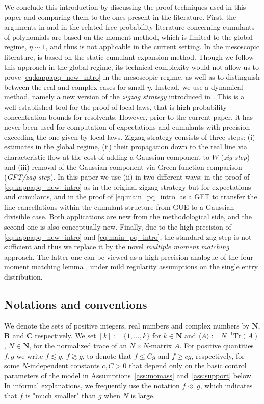 \documentclass[10pt]{amsart}
\numberwithin{equation}{section}
\newcommand{\R}{\mathbf{R}}
\newcommand{\C}{\mathbf{C}}
\newcommand{\N}{\mathbf{N}}
\begin{document}
We conclude this introduction by discussing the proof techniques used in this paper and comparing them to the ones present in the literature. First, the arguments in \cite{Ultra_high_cumulants} and in the related free probability literature concerning cumulants of polynomials are based on the moment method, which is limited to the global regime, $\eta\sim1$,  and thus is not applicable in the current setting. In the mesoscopic literature, \cite{HeKnowles} is based on the static cumulant expansion method. Though we follow this approach in the global regime, its technical complexity would not allow us to prove \eqref{eq:kappapq_new_intro} in the mesoscopic regime, as well as to distinguish between the real and complex cases for small $\eta$. Instead, we use a dynamical method, namely a new version of the \emph{zigzag strategy} introduced in \cite{cipolloni2024out,Cipolloni_meso, cipolloni2023eigenstate}. This is a well-established tool for the proof of local laws, that is high probability concentration bounds for resolvents. However, prior to the current paper, it has never been used for computation of expectations and cumulants with precision exceeding the one given by local laws. Zigzag strategy consists of three steps: (i) estimates in the global regime, (ii) their propagation down to the real line via characteristic flow at the cost of adding a Gaussian component to $W$ (\emph{zig step}) and (iii) removal of the Gaussian component via Green function comparison (\emph{GFT/zag step}). In this paper we use (ii) in two different ways: in the proof of \eqref{eq:kappapq_new_intro} as in the original zigzag strategy but for expectations and cumulants, and in the proof of \eqref{eq:main_pq_intro} as a GFT to transfer the fine cancellations within the cumulant structure from GUE to a Gaussian divisible case. Both applications are new from the methodological side, and the second one is also conceptually new. Finally, due to the high precision of \eqref{eq:kappapq_new_intro} and \eqref{eq:main_pq_intro}, the standard zag step is not sufficient and thus we replace it by the novel \emph{multiple moment matching} approach. The latter one can be viewed as a high-precision analogue of the four moment matching lemma \cite[Lemma~6.5]{bulk_univ_genW}, \cite{TaoVu11} under mild regularity assumptions on the single entry distribution.



\subsection*{Notations and conventions}
We denote the sets of positive integers, real numbers and complex numbers by $\N$, $\R$ and $\C$ respectively. We set $[k] := \{1, ... , k\}$ for $k \in \N$ and $\langle A \rangle := N^{-1} \mathrm{Tr}(A)$, $N \in \N$, for the normalized trace of an $N \times N$-matrix $A$. For positive quantities $f, g$ we write $f \lesssim g$, $f \gtrsim g$, to denote that $f \le C g$ and $f \ge c g$, respectively, for some $N$-independent constants $c, C > 0$ that depend only on the basic control parameters of the model in Assumptions~\ref{ass:momass} and~\ref{ass:support} below. In informal explanations, we frequently use the notation $f\ll g$, which indicates that $f$ is "much smaller" than $g$ when $N$ is large. 
\end{document}
